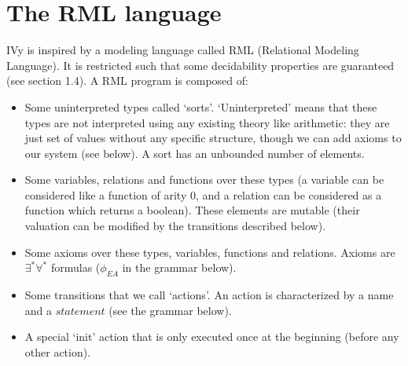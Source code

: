 \documentclass[11pt,a4paper,oldfontcommands,openany]{memoir}
\begin{document}
    \section{The RML language}

    IVy is inspired by a modeling language called RML (Relational Modeling Language). It is restricted such that some decidability properties are guaranteed (see section 1.4).
    A RML program is composed of:
    \begin{itemize}
        \item Some uninterpreted types called `sorts'. `Uninterpreted' means that these types are not interpreted using any existing theory like arithmetic:
        they are just set of values without any specific structure, though we can add axioms to our system (see below).
        A sort has an unbounded number of elements.
        \item Some variables, relations and functions over these types (a variable can be considered like a function of arity 0, and a relation can be considered as a function
        which returns a boolean). These elements are mutable (their valuation can be modified by the transitions described below).
        \item Some axioms over these types, variables, functions and relations. Axioms are \(\exists^*\forall^*\) formulas (\( \phi_{EA} \) in the grammar below).
        \item Some transitions that we call `actions'. An action is characterized by a name and a \(statement\) (see the grammar below).
        \item A special `init' action that is only executed once at the beginning (before any other action).
    \end{itemize}
\end{document}
